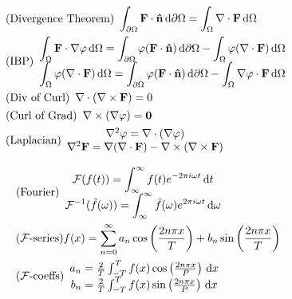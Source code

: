 \documentclass[landscape,paperwidth=1920pt, paperheight = 1080pt,fontscale=0.45,columns=3, margin = 0px]{Poster} %
\begin{document}
\begin{poster}
{\begin{align*}
  & \tag{Divergence Theorem}
  \begin{array}{c}
    \displaystyle\int_{\partial\Omega} \mathbf{F}\cdot \mathbf{\hat{n}} \,\mathrm{d} \partial\Omega = \int_\Omega \nabla \cdot \mathbf{F} \,\mathrm{d} \Omega
  \end{array}\\
  & \tag{IBP}
  \begin{array}{c}
    \displaystyle\int_\Omega \mathbf{F}\cdot \nabla \varphi \,\mathrm{d} \Omega = \int_{\partial\Omega} \varphi (\mathbf{F}\cdot \mathbf{\hat{n}}) \,\mathrm{d} \partial\Omega - \int_\Omega \varphi (\nabla \cdot \mathbf{F})\,\mathrm{d} \Omega \\
    \displaystyle\int_\Omega \varphi (\nabla \cdot \mathbf{F}) \,\mathrm{d} \Omega = \int_{\partial\Omega} \varphi (\mathbf{F}\cdot \mathbf{\hat{n}}) \,\mathrm{d} \partial\Omega - \int_\Omega \nabla \varphi \cdot \mathbf{F}\,\mathrm{d} \Omega
  \end{array}\\
  & \tag{Div of Curl}
  \begin{array}{c}
    \nabla \cdot (\nabla \times \mathbf{F}) = 0
  \end{array}\\
  & \tag{Curl of Grad}
  \begin{array}{c}
    \nabla \times (\nabla \varphi) = \mathbf{0}
  \end{array}\\
  & \tag{Laplacian}
  \begin{array}{c}
    \nabla^2 \varphi = \nabla \cdot (\nabla\varphi) \\
    \nabla^2 \mathbf{F} = \nabla(\nabla\cdot \mathbf{F}) - \nabla \times (\nabla\times \mathbf{F})
  \end{array}
\end{align*}


\begin{align*}
  & \tag{Fourier}
  \begin{array}{c}
    \displaystyle\mathcal{F}(f(t)) = \int_{\infty}^\infty f(t) e^{-2\pi i \omega t}\d t\\
    \displaystyle\mathcal{F}^{-1}(\hat{f}(\omega)) = \int_{\infty}^{\infty} \hat{f}(\omega)e^{2\pi i \omega t}\d \omega
  \end{array}\\
  & \tag{$\mathcal{F}$-series}
  f(x) = \sum_{n=0}^\infty a_n \cos\left(\frac{2n\pi x}{T}\right) + b_n \sin\left(\frac{2n\pi x}{T}\right)\\
  & \tag{$\mathcal{F}$-coeffs}
  \begin{array}{c}
    a_n = \frac{2}{T}\int_{-T}^T f(x)\cos\left(\frac{2n\pi x}{P}\right)\d x\\
    b_n = \frac{2}{T}\int_{-T}^T f(x)\sin\left(\frac{2n\pi x}{P}\right)\d x
  \end{array}
\end{align*}

}
\end{poster}
\end{document}
